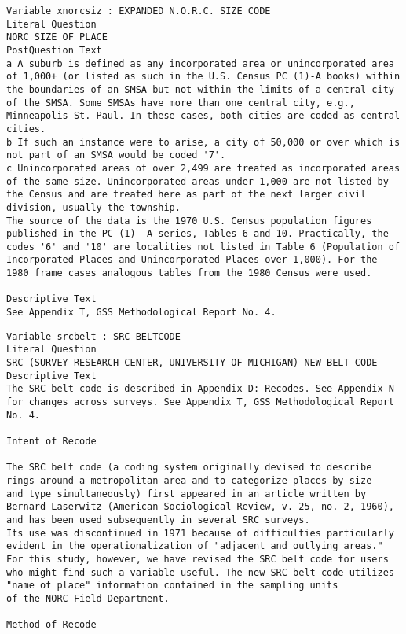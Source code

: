 \documentclass[12pt, letterpaper]{article}
\begin{document}
\begin{spacing}{1.9}
{\begin{verbatim}
Variable xnorcsiz : EXPANDED N.O.R.C. SIZE CODE
Literal Question
NORC SIZE OF PLACE
PostQuestion Text
a A suburb is defined as any incorporated area or unincorporated area
of 1,000+ (or listed as such in the U.S. Census PC (1)-A books) within
the boundaries of an SMSA but not within the limits of a central city
of the SMSA. Some SMSAs have more than one central city, e.g.,
Minneapolis-St. Paul. In these cases, both cities are coded as central
cities.
b If such an instance were to arise, a city of 50,000 or over which is
not part of an SMSA would be coded '7'.
c Unincorporated areas of over 2,499 are treated as incorporated areas
of the same size. Unincorporated areas under 1,000 are not listed by
the Census and are treated here as part of the next larger civil
division, usually the township.
The source of the data is the 1970 U.S. Census population figures
published in the PC (1) -A series, Tables 6 and 10. Practically, the
codes '6' and '10' are localities not listed in Table 6 (Population of
Incorporated Places and Unincorporated Places over 1,000). For the
1980 frame cases analogous tables from the 1980 Census were used.

Descriptive Text
See Appendix T, GSS Methodological Report No. 4.
\end{verbatim}

\begin{verbatim}
Variable srcbelt : SRC BELTCODE
Literal Question
SRC (SURVEY RESEARCH CENTER, UNIVERSITY OF MICHIGAN) NEW BELT CODE
Descriptive Text
The SRC belt code is described in Appendix D: Recodes. See Appendix N
for changes across surveys. See Appendix T, GSS Methodological Report
No. 4.

Intent of Recode

The SRC belt code (a coding system originally devised to describe
rings around a metropolitan area and to categorize places by size
and type simultaneously) first appeared in an article written by
Bernard Laserwitz (American Sociological Review, v. 25, no. 2, 1960),
and has been used subsequently in several SRC surveys.
Its use was discontinued in 1971 because of difficulties particularly
evident in the operationalization of "adjacent and outlying areas."
For this study, however, we have revised the SRC belt code for users
who might find such a variable useful. The new SRC belt code utilizes
"name of place" information contained in the sampling units
of the NORC Field Department.

Method of Recode


\end{verbatim}}
\end{spacing}
\end{document}

